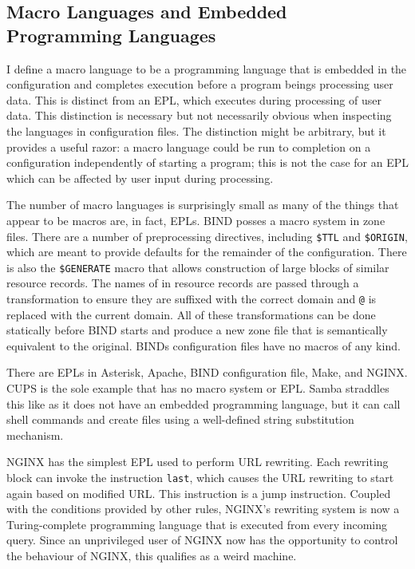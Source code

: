 \documentclass[letterpaper,twocolumn,10pt]{article}
\begin{document}
\subsection{Macro Languages and Embedded Programming Languages}
I define a macro language to be a programming language that is embedded in the configuration and completes execution before a program beings processing user data. This is distinct from an EPL, which executes during processing of user data. This distinction is necessary but not necessarily obvious when inspecting the languages in configuration files. The distinction might be arbitrary, but it provides a useful razor: a macro language could be run to completion on a configuration independently of starting a program; this is not the case for an EPL which can be affected by user input during processing.

The number of macro languages is surprisingly small as many of the things that appear to be macros are, in fact, EPLs. BIND posses a macro system in zone files. There are a number of preprocessing directives, including \texttt{\$TTL} and \texttt{\$ORIGIN}, which are meant to provide defaults for the remainder of the configuration. There is also the \texttt{\$GENERATE} macro that allows construction of large blocks of similar resource records. The names of in resource records are passed through a transformation to ensure they are suffixed with the correct domain and \texttt{@} is replaced with the current domain. All of these transformations can be done statically before BIND starts and produce a new zone file that is semantically equivalent to the original. BINDs configuration files have no macros of any kind.

There are EPLs in Asterisk, Apache, BIND configuration file, Make, and NGINX. CUPS is the sole example that has no macro system or EPL. Samba straddles this like as it does not have an embedded programming language, but it can call shell commands and create files using a well-defined string substitution mechanism.

NGINX has the simplest EPL used to perform URL rewriting. Each rewriting block can invoke the instruction \texttt{last}, which causes the URL rewriting to start again based on modified URL. This instruction is a jump instruction. Coupled with the conditions provided by other rules, NGINX's rewriting system is now a Turing-complete programming language that is executed from every incoming query. Since an unprivileged user of NGINX now has the opportunity to control the behaviour of NGINX, this qualifies as a weird machine.
\end{document}
